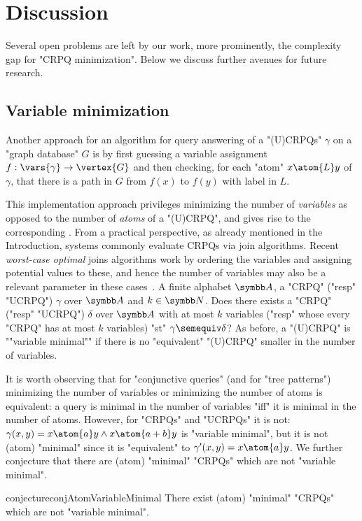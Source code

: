 \section{Discussion}
\AP\label{sec:discussion}

Several open problems are left by our work, more prominently, the complexity gap for "CRPQ minimization". Below we discuss further avenues for future research.

\subsection{Variable minimization}
\AP\label{sec:varmin}

Another approach for an algorithm for query answering of a "(U)CRPQs" $\gamma$ on a "graph database" $G$ is by first guessing a variable assignment $f: \vars{\gamma} \to \vertex{G}$ and then checking, for each "atom" $x \atom{L} y$ of $\gamma$, that there is a path in $G$ from $f(x)$ to $f(y)$ with label in $L$. 

This implementation approach privileges minimizing the number of \emph{variables} as opposed to the number of \emph{atoms} of a "(U)CRPQ", and gives rise to the corresponding . From a practical perspective, as already mentioned in the Introduction, systems commonly evaluate CRPQs via join algorithms. Recent \emph{worst-case optimal} joins algorithms work by ordering the variables and assigning potential values to these, and hence the number of variables may also be a relevant parameter in these cases~\cite{CucumidesReutterVrgoc2024SizeBounds,VrgocEtal2024MillenniumDB}. 
{A finite alphabet $\A$, a  "CRPQ" ("resp" "UCRPQ") $\gamma$ over $\A$ and $k \in \N$.}
{Does there exists a "CRPQ" ("resp" "UCRPQ") $\delta$ over $\A$ with at most $k$ variables 
("resp" whose every "CRPQ" has at most $k$ variables) "st" $\gamma \semequiv \delta$?}
As before, a "(U)CRPQ" is \AP""variable minimal"" if there is no "equivalent" "(U)CRPQ" smaller in the number of variables.

It is worth observing that for "conjunctive queries" (and for "tree patterns") minimizing the number of variables or minimizing the number of atoms is equivalent: a query is minimal in the number of variables "iff" it is minimal in the number of atoms.
However, for "CRPQs" and "UCRPQs" it is not: $\gamma(x,y) = x \atom{a} y \land x \atom{a+b} y$ is "variable minimal", but it is not (atom) "minimal" since it is "equivalent" to $\gamma'(x,y) = x \atom{a} y$. We further conjecture that there are (atom) "minimal" "CRPQs" which are not "variable minimal".
\begin{restatable}{conjecture}{conjAtomVariableMinimal}
  There exist (atom) "minimal" "CRPQs" which are not "variable minimal".
\end{restatable}

